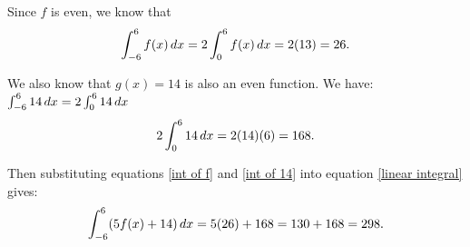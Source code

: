 \documentclass{ximera}
\begin{document}
\begin{problem}
\begin{enumerate}
\begin{explanation}
            Since $f$ is even, we know that
            \begin{equation}\label{int of f}
              \int_{-6}^6 f(x) \,d x = 2 \int_0^6 f(x) \,d x = 2 (13) = 26.
            \end{equation}
            
            We also know that $g(x)=14$ is also an even function.  We have:
             $\int_{-6}^6 14 \,d x = 2\int_{0}^6 14 \,d x$
            \begin{equation}\label{int of 14}
              2\int_{0}^6 14 \,d x =  2(14)(6) = 168.
            \end{equation}
            
            Then substituting equations \eqref{int of f} and \eqref{int of 14} into equation \eqref{linear integral} gives:
            \begin{equation*}
              \int_{-6}^6 (5f(x) + 14) \,d x = 5(26) + 168 = 130 + 168 = 298.
            \end{equation*}
          \end{explanation}
\end{enumerate}
\end{problem}
\end{document}
